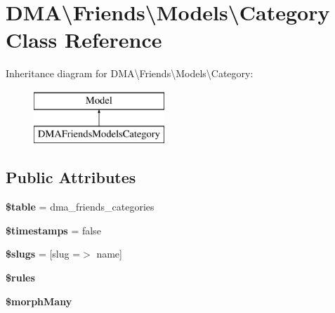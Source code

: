 \hypertarget{classDMA_1_1Friends_1_1Models_1_1Category}{}\section{D\+M\+A\textbackslash{}Friends\textbackslash{}Models\textbackslash{}Category Class Reference}
\label{classDMA_1_1Friends_1_1Models_1_1Category}
Inheritance diagram for D\+M\+A\textbackslash{}Friends\textbackslash{}Models\textbackslash{}Category\+:\begin{figure}[H]
\begin{center}
\leavevmode
\includegraphics[height=2.000000cm]{de/d78/classDMA_1_1Friends_1_1Models_1_1Category}
\end{center}
\end{figure}
\subsection*{Public Attributes}
\begin{DoxyCompactItemize}
\item 
\hypertarget{classDMA_1_1Friends_1_1Models_1_1Category_a07d3500cfe462a4db9703ae093158cad}{}{\bfseries \$table} = \textquotesingle{}dma\+\_\+friends\+\_\+categories\textquotesingle{}\label{classDMA_1_1Friends_1_1Models_1_1Category_a07d3500cfe462a4db9703ae093158cad}

\item 
\hypertarget{classDMA_1_1Friends_1_1Models_1_1Category_a2f7a923f3b13a157cc81e2333977584f}{}{\bfseries \$timestamps} = false\label{classDMA_1_1Friends_1_1Models_1_1Category_a2f7a923f3b13a157cc81e2333977584f}

\item 
\hypertarget{classDMA_1_1Friends_1_1Models_1_1Category_a18557e5621449f9dd6789a00fabacc9c}{}{\bfseries \$slugs} = \mbox{[}\textquotesingle{}slug\textquotesingle{} =$>$ \textquotesingle{}name\textquotesingle{}\mbox{]}\label{classDMA_1_1Friends_1_1Models_1_1Category_a18557e5621449f9dd6789a00fabacc9c}

\item 
{\bfseries \$rules}
\item 
{\bfseries \$morph\+Many}
\end{DoxyCompactItemize}
